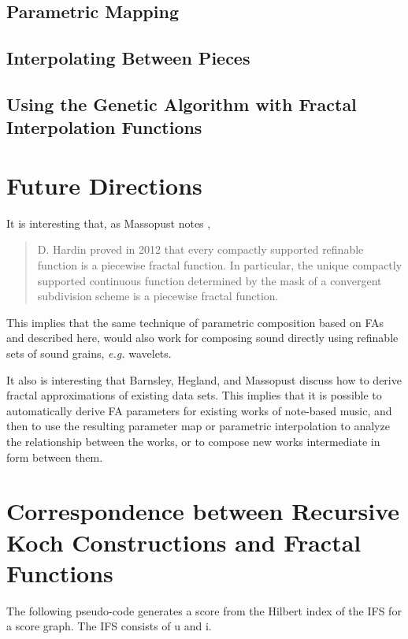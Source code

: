 \documentclass[english,11pt,letterpaper,onecolumn]{scrartcl}
\numberwithin{equation}{section}
\begin{document}
\subsection{Parametric Mapping}


\subsection{Interpolating Between Pieces}


\subsection{Using the Genetic Algorithm with Fractal Interpolation
Functions}

\section{Future Directions}

It is interesting that, as Massopust notes \cite{massopust2017},
\begin{quote}D. Hardin proved in 2012 that every compactly supported
refinable function is a piecewise fractal function. In particular, the
unique
compactly supported continuous function determined by the mask of a
convergent
subdivision scheme is a piecewise fractal function. \end{quote}
This implies that the same technique of parametric
composition based on FAs and described here, would also work for composing
sound directly using refinable sets of sound grains, \textit{e.g.}
wavelets.

It also is interesting that Barnsley, Hegland, and Massopust
\cite{2013arXiv1309.0972B} discuss how to derive fractal approximations of
existing data sets. This implies that it is possible to automatically derive FA
parameters for existing works of note-based music, and then to use the resulting
parameter map or parametric interpolation to analyze the relationship between
the works, or to compose new works intermediate in form between them.

\section{Correspondence between Recursive Koch Constructions and Fractal Functions}

The following pseudo-code generates a score from the Hilbert index of the IFS
for a score graph. The IFS consists of u and i.
\end{document}
